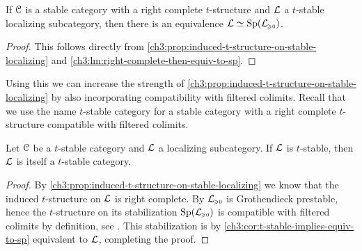 \begin{corollary}
    \label{ch3:cor:t-stable-implies-equiv-to-sp}
    If $\EuScript{C}$ is a stable category with a right complete $t$-structure and $\mathcal{L}$ a $t$-stable localizing subcategory, then there is an equivalence $\mathcal{L}\simeq \mathrm{Sp}(\mathcal{L}_{\hspace{-1pt}\scriptscriptstyle\geqslant 0})$. 
\end{corollary}
\begin{proof}
    This follows directly from \cref{ch3:prop:induced-t-structure-on-stable-localizing} and \cref{ch3:lm:right-complete-then-equiv-to-sp}.
\end{proof}

Using this we can increase the strength of \cref{ch3:prop:induced-t-structure-on-stable-localizing} by also incorporating compatibility with filtered colimits. Recall that we use the name $t$-stable category for a stable category with a right complete $t$-structure compatible with filtered colimits. 

\begin{lemma}
    \label{ch3:lm:localizing-inherits-completeness-and-colimits}
    Let $\EuScript{C}$ be a $t$-stable category and $\mathcal{L}$ a localizing subcategory. If $\mathcal{L}$ is $t$-stable, then $\mathcal{L}$ is itself a $t$-stable category. 
\end{lemma}
\begin{proof}
    By \cref{ch3:prop:induced-t-structure-on-stable-localizing} we know that the induced $t$-structure on $\mathcal{L}$ is right complete. By \cite[C.5.2.1(1)]{lurie_SAG} $\mathcal{L}_{\hspace{-1pt}\scriptscriptstyle\geqslant 0}$ is Grothendieck prestable, hence the $t$-structure on its stabilization $\mathrm{Sp}(\mathcal{L}_{\hspace{-1pt}\scriptscriptstyle\geqslant 0})$ is compatible with filtered colimits by definition, see \cite[C.1.4.1]{lurie_SAG}. This stabilization is by \cref{ch3:cor:t-stable-implies-equiv-to-sp} equivalent to $\mathcal{L}$, completing the proof. 
\end{proof}




